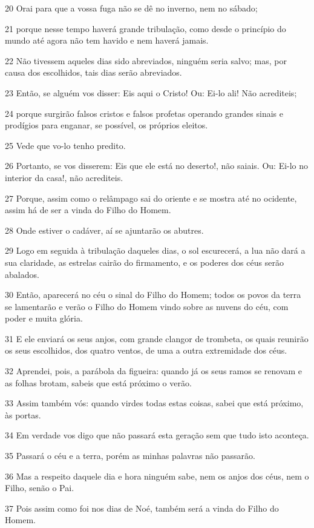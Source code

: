 \par 20 Orai para que a vossa fuga não se dê no inverno, nem no sábado;
\par 21 porque nesse tempo haverá grande tribulação, como desde o princípio do mundo até agora não tem havido e nem haverá jamais.
\par 22 Não tivessem aqueles dias sido abreviados, ninguém seria salvo; mas, por causa dos escolhidos, tais dias serão abreviados.
\par 23 Então, se alguém vos disser: Eis aqui o Cristo! Ou: Ei-lo ali! Não acrediteis;
\par 24 porque surgirão falsos cristos e falsos profetas operando grandes sinais e prodígios para enganar, se possível, os próprios eleitos.
\par 25 Vede que vo-lo tenho predito.
\par 26 Portanto, se vos disserem: Eis que ele está no deserto!, não saiais. Ou: Ei-lo no interior da casa!, não acrediteis.
\par 27 Porque, assim como o relâmpago sai do oriente e se mostra até no ocidente, assim há de ser a vinda do Filho do Homem.
\par 28 Onde estiver o cadáver, aí se ajuntarão os abutres.
\par 29 Logo em seguida à tribulação daqueles dias, o sol escurecerá, a lua não dará a sua claridade, as estrelas cairão do firmamento, e os poderes dos céus serão abalados.
\par 30 Então, aparecerá no céu o sinal do Filho do Homem; todos os povos da terra se lamentarão e verão o Filho do Homem vindo sobre as nuvens do céu, com poder e muita glória.
\par 31 E ele enviará os seus anjos, com grande clangor de trombeta, os quais reunirão os seus escolhidos, dos quatro ventos, de uma a outra extremidade dos céus.
\par 32 Aprendei, pois, a parábola da figueira: quando já os seus ramos se renovam e as folhas brotam, sabeis que está próximo o verão.
\par 33 Assim também vós: quando virdes todas estas coisas, sabei que está próximo, às portas.
\par 34 Em verdade vos digo que não passará esta geração sem que tudo isto aconteça.
\par 35 Passará o céu e a terra, porém as minhas palavras não passarão.
\par 36 Mas a respeito daquele dia e hora ninguém sabe, nem os anjos dos céus, nem o Filho, senão o Pai.
\par 37 Pois assim como foi nos dias de Noé, também será a vinda do Filho do Homem.
